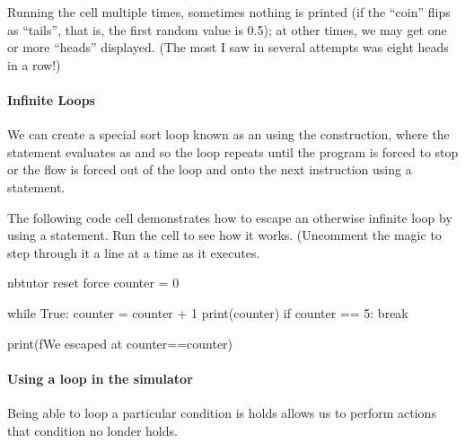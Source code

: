 \documentclass[letterpaper,10pt,english]{sphinxmanual}
\begin{document}
Running the cell multiple times, sometimes nothing is printed (if the “coin” flips as “tails”, that is, the first random value is  0.5); at other times, we may get one or more “heads” displayed. (The most I saw in several attempts was eight heads in a row!)


\paragraph{Infinite Loops}
\label{\detokenize{content/02_Robot_Lab/Section_00_01:Infinite-Loops}}
We can create a special sort loop known as an  using the  construction, where the statement   evaluates as  and so the loop repeats until the program is forced to stop or the flow is forced out of the loop and onto the next instruction using a  statement.

The following code cell demonstrates how to escape an otherwise infinite loop by using a  statement. Run the cell to see how it works. (Uncomment the  magic to step through it a line at a time as it executes.

{
\begin{sphinxVerbatim}[commandchars=\\\{\}]
\llap{\color{nbsphinxin}[ ]:\,\hspace{\fboxrule}\hspace{\fboxsep}}\PYGZsh{}\PYGZpc{}\PYGZpc{}nbtutor \PYGZhy{}\PYGZhy{}reset \PYGZhy{}\PYGZhy{}force
counter = 0

while True:
    counter = counter + 1
    print(counter)
    if counter == 5:
        break

print(f\PYGZdq{}We escaped at counter==\PYGZob{}counter\PYGZcb{}\PYGZdq{})
\end{sphinxVerbatim}
}


\paragraph{Using a  loop in the simulator}
\label{\detokenize{content/02_Robot_Lab/Section_00_01:Using-a-while-loop-in-the-simulator}}
Being able to loop  a particular condition is holds allows us to perform actions  that condition no londer holds.
\end{document}
